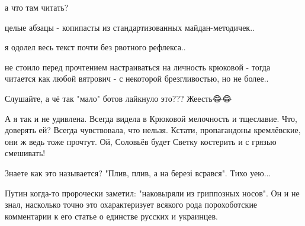 \begin{itemize}
\begin{itemize}
 

а что там читать?

целые абзацы - копипасты из стандартизованных майдан-методичек..

я одолел весь текст почти без рвотного рефлекса..

не стоило перед прочтением настраиваться на личность крюковой - тогда читается
как любой вятрович - с некоторой брезгливостью, но не более..

\end{itemize}

 
Слушайте, а чё так "мало" ботов лайкнуло это??? Жеесть😂😂

 

А я так и не удивлена. Всегда видела в Крюковой мелочность и тщеславие. Что,
доверять ей? Всегда чувствовала, что нельзя. Кстати, пропагандоны кремлёвские,
они ж ведь тоже прочтут. Ой, Соловьёв будет Светку костерить и с грязью
смешивать!

 
Знаете как это называется?
"Плив, плив, а на березі всрався".
Тихо уею...

 

Путин когда-то пророчески заметил: "наковыряли из гриппозных носов". Он и не
знал, насколько точно это охарактеризует всякого рода порохоботские комментарии
к его статье о единстве русских и украинцев.


\end{itemize}
